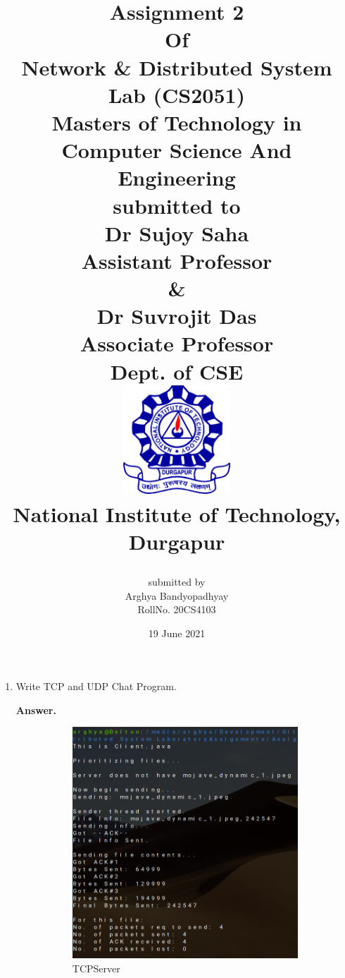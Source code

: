 \documentclass{article}
\author{\Large submitted by\\ Arghya Bandyopadhyay\\
    	RollNo. 20CS4103\\}
\title{\begin{center}
       \bfseries\Large
    	Assignment 2\\
    	Of\\
    	Network \& Distributed System Lab (CS2051)\\
        Masters of Technology in Computer Science And Engineering\\
    	\vskip1cm
    	submitted to\\
    	Dr Sujoy Saha\\
    	Assistant Professor\\
    	\&\\
    	Dr Suvrojit Das\\
    	Associate Professor\\
    	Dept. of CSE\\
    	\vskip1cm
    	\includegraphics[width=4cm]{NITDGP}\\
    	National Institute of Technology, Durgapur\\
    \end{center}}
\date{19 June 2021}
\begin{document}
\maketitle
\pagebreak

\begin{enumerate}
\item Write TCP and UDP Chat Program.
\begin{flushleft}
\textbf{Answer.}
\end{flushleft}


\pagebreak

\pagebreak

\begin{figure}[h]
\begin{subfigure}{.5\textwidth}
\includegraphics[width=350pt]{Output1}
\caption{TCPServer}
\label{TCPServer}
\end{subfigure}
\begin{subfigure}{.5\textwidth}

\end{subfigure}
\end{figure}
\end{enumerate}
\end{document}
